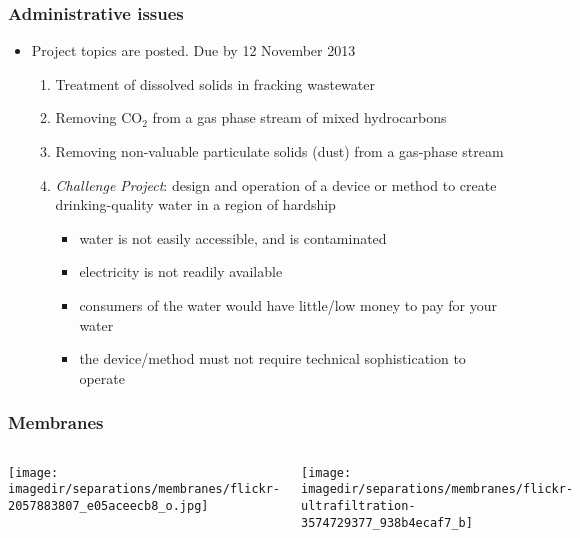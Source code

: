 




\begin{frame}\frametitle{Administrative issues}
	\begin{itemize}
		\item	Project topics are posted. Due by 12 November 2013
		\begin{enumerate}
			\item	Treatment of dissolved solids in fracking wastewater
			\item	Removing $\text{CO}_2$ from a gas phase stream of mixed hydrocarbons
			\item	Removing non-valuable particulate solids (dust) from a gas-phase stream
			\item	\emph{Challenge Project}: design and operation of a device or method to create drinking-quality water in a region of hardship
			\begin{itemize}
				\item	water is not easily accessible, and is contaminated
				\item	electricity is not readily available 
				\item	consumers of the water would have little/low money to pay for your water
				\item	the device/method must not require technical sophistication to operate
			\end{itemize}
		\end{enumerate}
	\end{itemize}
\end{frame}

\begin{frame}\frametitle{Membranes}
	\begin{columns}[c]
			\begin{center}
				\texttt{[image: \\imagedir/separations/membranes/flickr-2057883807\_e05aceecb8\_o.jpg]}
			\end{center}
			\begin{center}
				\texttt{[image: \\imagedir/separations/membranes/flickr-ultrafiltration-3574729377\_938b4ecaf7\_b]}
			\end{center}
	\end{columns}
\end{frame}

